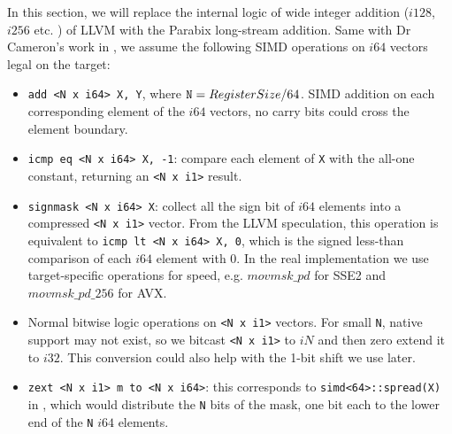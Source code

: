 In this section, we will replace the internal logic of wide integer addition ($i128$, $i256$ etc. ) of LLVM with the Parabix long-stream addition. Same with Dr Cameron's work in \cite{rob_regex}, we assume the following SIMD operations on $i64$ vectors legal on the target:
\begin{itemize}
    \item \verb|add <N x i64> X, Y|, where $\text{\tt N} = RegisterSize / 64$. SIMD addition on each corresponding element of the $i64$ vectors, no carry bits could cross the element boundary.
    \item \verb|icmp eq <N x i64> X, -1|: compare each element of {\tt X} with the all-one constant, returning an \verb|<N x i1>| result.
    \item \verb|signmask <N x i64> X|: collect all the sign bit of $i64$ elements into a compressed \verb|<N x i1>| vector. From the LLVM speculation, this operation is equivalent to \verb|icmp lt <N x i64> X, 0|, which is the signed less-than comparison of each $i64$ element with 0. In the real implementation we use target-specific operations for speed, e.g. $movmsk\_pd$ for SSE2 and $movmsk\_pd\_256$ for AVX.
    \item Normal bitwise logic operations on \verb|<N x i1>| vectors. For small {\tt N}, native support may not exist, so we bitcast \verb|<N x i1>| to $iN$ and then zero extend it to $i32$. This conversion could also help with the 1-bit shift we use later.
    \item \verb|zext <N x i1> m to <N x i64>|: this corresponds to \verb|simd<64>::spread(X)| in \cite{rob_regex}, which would distribute the {\tt N} bits of the mask, one bit each to the lower end of the {\tt N} $i64$ elements.
\end{itemize}

